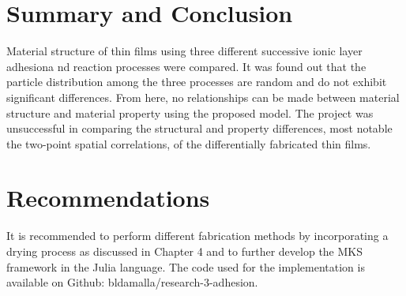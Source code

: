 \chapter{Summary and Conclusion}

Material structure of thin films using three different successive ionic layer adhesiona nd reaction processes were compared.
It was found out that the particle distribution among the three processes are random and do not exhibit significant differences.
From here, no relationships can be made between material structure and material property using the proposed model.
The project was unsuccessful in comparing the structural and property differences, most notable the two-point spatial correlations, of the differentially fabricated thin films.

\chapter{Recommendations}

It is recommended to perform different fabrication methods by incorporating a drying process as discussed in Chapter 4 and to further develop the MKS framework in the Julia language.
The code used for the implementation is available on Github: bldamalla/research-3-adhesion.
